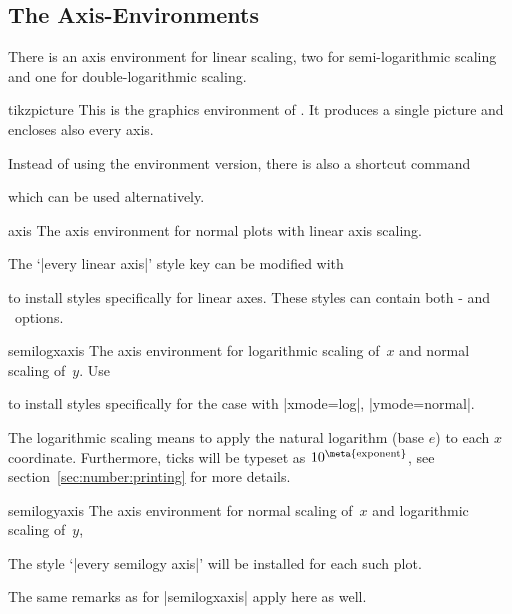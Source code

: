 

\subsection{The Axis-Environments}
There is an axis environment for linear scaling, two for semi-logarithmic scaling and one for double-logarithmic scaling.
\begin{environment}{{tikzpicture}}
	This is the graphics environment of \Tikz. It produces a single picture and encloses also every axis.

	Instead of using the environment version, there is also a shortcut command 

	\declareandlabel{\tikz}

	which can be used alternatively.
\end{environment}

\begin{environment}{{axis}}
	The axis environment for normal plots with linear axis scaling.

	The `|every linear axis|' style key can be modified with
\begin{codeexample}
\end{codeexample}
to install styles specifically for linear axes. These styles can contain both \Tikz- and \PGFPlots\ options.
\end{environment}

\begin{environment}{{semilogxaxis}}
The axis environment for logarithmic scaling of~$x$ and normal scaling of~$y$.
Use
\begin{codeexample}
\end{codeexample}
to install styles specifically for the case with |xmode=log|, |ymode=normal|.

The logarithmic scaling means to apply the natural logarithm (base $e$) to each $x$ coordinate. Furthermore, ticks will be typeset as $10^{\text{\meta{exponent}}}$, see section~\ref{sec:number:printing} for more details.
\end{environment}

\begin{environment}{{semilogyaxis}}
The axis environment for normal scaling of~$x$ and logarithmic scaling of~$y$,

The style `|every semilogy axis|' will be installed for each such plot.

The same remarks as for |semilogxaxis| apply here as well.
\end{environment}


